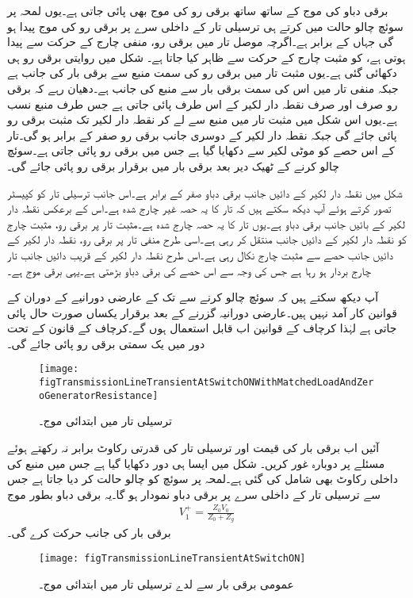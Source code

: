 برقی دباو کی موج کے ساتھ ساتھ برقی رو کی موج بھی پائی جاتی ہے۔یوں لمحہ  پر سوئچ چالو حالت میں کرتے ہی ترسیلی تار کے داخلی سرے پر  برقی رو کی موج پیدا ہو گی جہاں  کے برابر ہے۔اگرچہ موصل تار میں برقی رو، منفی چارج کے حرکت سے پیدا ہوتی ہے،  کو مثبت چارج کے حرکت سے ظاہر کیا جاتا ہے۔ شکل  میں روایتی برقی رو ہی دکھائی گئی ہے۔یوں مثبت تار میں برقی رو کی سمت منبع سے برقی بار کی جانب ہے جبکہ منفی تار میں اس کی سمت برقی بار سے منبع کی جانب ہے۔دھیان رہے کہ برقی رو صرف اور صرف نقطہ دار لکیر کے اس طرف پائی جاتی ہے جس طرف منبع نسب ہے۔یوں اس شکل میں مثبت تار میں منبع سے لے کر نقطہ دار لکیر تک مثبت برقی رو پائی جائے گی جبکہ نقطہ دار لکیر کے دوسری جانب برقی رو صفر کے برابر ہو گی۔تار کے اس حصے کو موٹی لکیر سے دکھایا گیا ہے جس میں برقی رو پائی جاتی ہے۔سوئچ چالو کرنے کے ٹھیک  دیر بعد برقی بار میں برقرار  برقی رو  پائی جائے گی۔

شکل  میں نقطہ دار لکیر کے دائیں جانب برقی دباو صفر کے برابر ہے۔اس جانب ترسیلی تار کو کپیسٹر تصور کرتے ہوئے آپ دیکھ سکتے ہیں کہ تار کا یہ حصہ غیر چارج شدہ ہے۔اس کے برعکس نقطہ دار لکیر کے بائیں جانب برقی دباو  ہے۔یوں تار کا یہ حصہ چارج شدہ ہے۔مثبت تار پر برقی رو، مثبت چارج کو نقطہ دار لکیر کے دائیں جانب منتقل کر رہی ہے۔اسی طرح منفی تار پر برقی رو، نقطہ دار لکیر کے دائیں جانب حصے سے مثبت چارج نکال رہی ہے۔اس طرح نقطہ دار لکیر کے قریب دائیں جانب تار چارج بردار ہو رہا ہے جس کی وجہ سے اس حصے کی برقی دباو بڑھتی ہے۔یہی برقی موج ہے۔

آپ دیکھ سکتے ہیں کہ  سوئچ چالو کرنے سے  تک کے عارضی دورانیے کے دوران  کے قوانین کار آمد نہیں ہیں۔عارضی دورانیہ گزرنے کے بعد برقرار یکساں صورت حال پائی جاتی ہے لہٰذا کرچاف کے قوانین اب قابل استعمال ہوں گے۔کرچاف کے قانون کے تحت دور میں یک سمتی برقی رو  پائی جائے گی۔
\begin{figure}
\centering
\texttt{[image: figTransmissionLineTransientAtSwitchONWithMatchedLoadAndZeroGeneratorResistance]}
\caption{ترسیلی تار میں ابتدائی موج۔}
\label{شکل_ترسیلی_ابتدائی_موج}
\end{figure}

آئیں اب برقی بار کی قیمت اور ترسیلی تار کی قدرتی رکاوٹ برابر نہ رکھتے ہوئے مسئلے پر دوبارہ غور کریں۔ شکل  میں ایسا ہی دور دکھایا گیا ہے جس میں منبع کی داخلی رکاوٹ بھی شامل کی گئی ہے۔لمحہ  پر سوئچ کو چالو حالت کر دیا جاتا ہے جس سے ترسیلی تار کے داخلی سرے پر  برقی دباو نمودار ہو گا۔یہ برقی دباو بطور موج  
\begin{align}\label{مساوات_ترسیلی_عارضی_پہلی}
V_1^+=\frac{Z_0 V_0}{Z_0+Z_g}
\end{align}
برقی بار کی جانب حرکت کرے گی۔
\begin{figure}
\centering
\texttt{[image: figTransmissionLineTransientAtSwitchON]}
\caption{عمومی برقی بار سے لدے ترسیلی تار میں ابتدائی موج۔}
\label{شکل_ترسیلی_عمومی_بار_ابتدائی_موج}
\end{figure}

